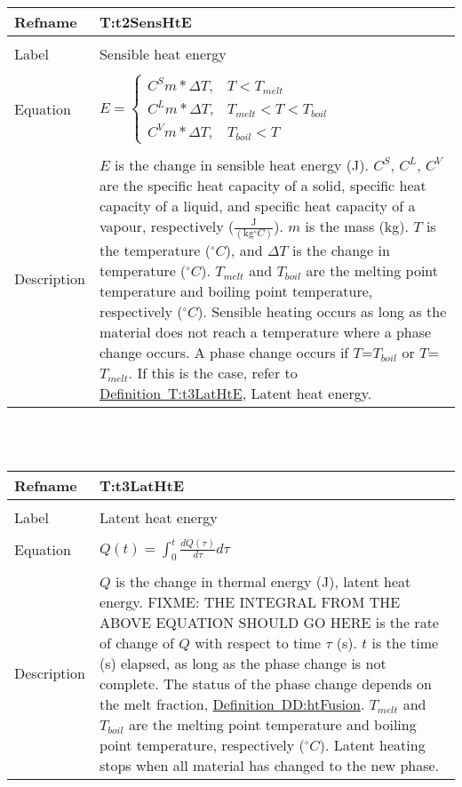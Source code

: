 \documentclass[12pt]{article}
\begin{document}
\noindent \begin{minipage}{\textwidth}
\begin{tabular}{p{} p{}}
\toprule \textbf{Refname} & \textbf{T:t2SensHtE}
\label{T:t2SensHtE}
\\ \midrule \\
Label & Sensible heat energy
\\ \midrule \\
Equation & $E=\begin{cases}
C^{S}m*\Delta{}T, & T<T_{melt}\\
C^{L}m*\Delta{}T, & T_{melt}<T<T_{boil}\\
C^{V}m*\Delta{}T, & T_{boil}<T
\end{cases}$
\\ \midrule \\
Description & $E$ is the change in sensible heat energy (J). $C^{S}$, $C^{L}$, $C^{V}$ are the specific heat capacity of a solid, specific heat capacity of a liquid, and specific heat capacity of a vapour, respectively ($\frac{\text{J}}{(\text{kg}{}^{\circ}C)}$). $m$ is the mass (kg). $T$ is the temperature (${}^{\circ}C$), and $\Delta{}T$ is the change in temperature (${}^{\circ}C$). $T_{melt}$ and $T_{boil}$ are the melting point temperature and boiling point temperature, respectively (${}^{\circ}C$). Sensible heating occurs as long as the material does not reach a temperature where a phase change occurs. A phase change occurs if $T$=$T_{boil}$ or $T$=$T_{melt}$. If this is the case, refer to \hyperref[T:t3LatHtE]{Definition~T:t3LatHtE}, Latent heat energy.
\\ \bottomrule \end{tabular}
\end{minipage}\\
~\newline
\noindent \begin{minipage}{\textwidth}
\begin{tabular}{p{} p{}}
\toprule \textbf{Refname} & \textbf{T:t3LatHtE}
\label{T:t3LatHtE}
\\ \midrule \\
Label & Latent heat energy
\\ \midrule \\
Equation & $Q\left(t\right)=\int_{0}^{t}{\frac{dQ\left(\tau{}\right)}{d\tau{}}d\tau{}}$
\\ \midrule \\
Description & $Q$ is the change in thermal energy (J), latent heat energy. FIXME: THE INTEGRAL FROM THE ABOVE EQUATION SHOULD GO HERE is the rate of change of $Q$ with respect to time $\tau{}$ (s). $t$ is the time (s) elapsed, as long as the phase change is not complete. The status of the phase change depends on the melt fraction, \hyperref[DD:htFusion]{Definition~DD:htFusion}. $T_{melt}$ and $T_{boil}$ are the melting point temperature and boiling point temperature, respectively (${}^{\circ}C$). Latent heating stops when all material has changed to the new phase.
\\ \bottomrule \end{tabular}
\end{minipage}\\
\end{document}
